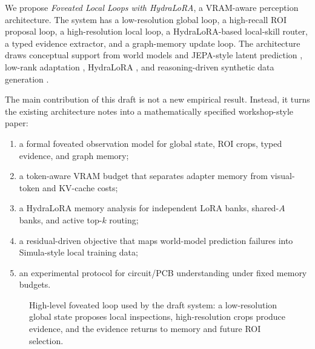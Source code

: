 \documentclass[11pt]{article}
\begin{document}
We propose \emph{Foveated Local Loops with HydraLoRA}, a VRAM-aware perception architecture.
The system has a low-resolution global loop, a high-recall ROI proposal loop, a high-resolution local loop, a HydraLoRA-based local-skill router, a typed evidence extractor, and a graph-memory update loop.
The architecture draws conceptual support from world models and JEPA-style latent prediction \citep{ha2018worldmodels,hafner2023dreamerv3,assran2023ijepa,bardes2024vjepa,maes2026leworldmodel}, low-rank adaptation \citep{hu2021lora,dettmers2023qlora}, HydraLoRA \citep{tian2024hydralora}, and reasoning-driven synthetic data generation \citep{davidson2026simula}.

The main contribution of this draft is not a new empirical result.
Instead, it turns the existing architecture notes into a mathematically specified workshop-style paper:
\begin{enumerate}[leftmargin=*]
  \item a formal foveated observation model for global state, ROI crops, typed evidence, and graph memory;
  \item a token-aware VRAM budget that separates adapter memory from visual-token and KV-cache costs;
  \item a HydraLoRA memory analysis for independent LoRA banks, shared-$A$ banks, and active top-$k$ routing;
  \item a residual-driven objective that maps world-model prediction failures into Simula-style local training data;
  \item an experimental protocol for circuit/PCB understanding under fixed memory budgets.
\end{enumerate}

\begin{figure}[t]
  \centering
  \setlength{\fboxsep}{8pt}
  \caption{High-level foveated loop used by the draft system: a low-resolution global state proposes local inspections, high-resolution crops produce evidence, and the evidence returns to memory and future ROI selection.}
  \label{fig:foveated-loop}
\end{figure}
\end{document}
